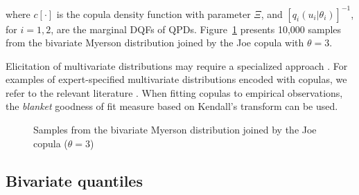 \documentclass[
  fleqn,
  deca,
  blindrev
]{informs4}
\begin{document}
where \(c[\cdot]\) is the copula density function with parameter
\(\Xi\), and \([q_i(u_i\vert\theta_i)]^{-1}\), for \(i=1,2\), are the
marginal DQFs of QPDs. Figure~\ref{fig-bc-myerson} presents 10,000
samples from the bivariate Myerson distribution joined by the Joe copula
with \(\theta=3\).

Elicitation of multivariate distributions may require a specialized
approach
\citep{elfadaly2017ElicitingDirichletGaussian, wilson2021RecentAdvancesElicitation}.
For examples of expert-specified multivariate distributions encoded with
copulas, we refer to the relevant literature
\citep{wilson2018SpecificationInformativePrior, holzhauer2022ElicitingJudgementsDependent, sharma2018RegularizationVariableSelection, aas2009PaircopulaConstructionsMultiple}.
When fitting copulas to empirical observations, the \emph{blanket}
goodness of fit measure \citep{wang2000ModelSelectionSemiparametric}
based on Kendall's transform
\citep{genest2006GoodnessofFitProceduresCopula, genest2009GoodnessoffitTestsCopulas}
can be used.

\begin{figure}


\caption{\label{fig-bc-myerson}Samples from the bivariate Myerson
distribution joined by the Joe copula (\(\theta=3\))}

\end{figure}%

\subsection{Bivariate quantiles}\label{bivariate-quantiles}
\end{document}

